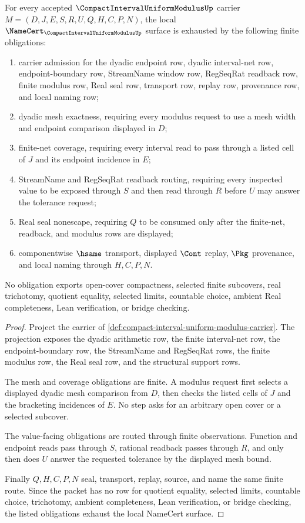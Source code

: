 \begin{theorem}\label{thm:compact-interval-uniform-modulus-namecert-obligations}
For every accepted $\CompactIntervalUniformModulusUp$ carrier $M=(D,J,E,S,R,U,Q,H,C,P,N)$, the local $\NameCert_{\CompactIntervalUniformModulusUp}$ surface is exhausted by the following finite obligations:
\begin{enumerate}
\item carrier admission for the dyadic endpoint row, dyadic interval-net row, endpoint-boundary row, StreamName window row, RegSeqRat readback row, finite modulus row, Real seal row, transport row, replay row, provenance row, and local naming row;
\item dyadic mesh exactness, requiring every modulus request to use a mesh width and endpoint comparison displayed in $D$;
\item finite-net coverage, requiring every interval read to pass through a listed cell of $J$ and its endpoint incidence in $E$;
\item StreamName and RegSeqRat readback routing, requiring every inspected value to be exposed through $S$ and then read through $R$ before $U$ may answer the tolerance request;
\item Real seal nonescape, requiring $Q$ to be consumed only after the finite-net, readback, and modulus rows are displayed;
\item componentwise $\hsame$ transport, displayed $\Cont$ replay, $\Pkg$ provenance, and local naming through $H,C,P,N$.
\end{enumerate}
No obligation exports open-cover compactness, selected finite subcovers, real trichotomy, quotient equality, selected limits, countable choice, ambient Real completeness, Lean verification, or bridge checking.
\end{theorem}
\begin{proof}
Project the carrier of \autoref{def:compact-interval-uniform-modulus-carrier}. The projection exposes the dyadic arithmetic row, the finite interval-net row, the endpoint-boundary row, the StreamName and RegSeqRat rows, the finite modulus row, the Real seal row, and the structural support rows.

The mesh and coverage obligations are finite. A modulus request first selects a displayed dyadic mesh comparison from $D$, then checks the listed cells of $J$ and the bracketing incidences of $E$. No step asks for an arbitrary open cover or a selected subcover.

The value-facing obligations are routed through finite observations. Function and endpoint reads pass through $S$, rational readback passes through $R$, and only then does $U$ answer the requested tolerance by the displayed mesh bound.

Finally $Q,H,C,P,N$ seal, transport, replay, source, and name the same finite route. Since the packet has no row for quotient equality, selected limits, countable choice, trichotomy, ambient completeness, Lean verification, or bridge checking, the listed obligations exhaust the local NameCert surface.
\end{proof}

